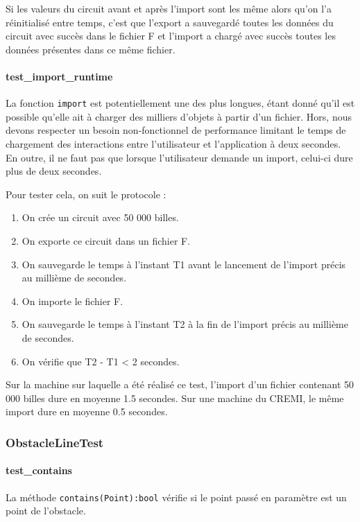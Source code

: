 \documentclass{report}
\begin{document}
Si les valeurs du circuit avant et après l’import sont les même alors qu’on l’a réinitialisé entre temps, c’est que l’export a sauvegardé toutes les données du circuit avec succès dans le fichier F et l’import a chargé avec succès toutes les données présentes dans ce même fichier.

\paragraph{test\_import\_runtime}

La fonction \texttt{import} est potentiellement une des plus longues, étant donné qu’il est possible qu’elle ait à charger des milliers d’objets à partir d’un fichier. Hors, nous devons respecter un besoin non-fonctionnel de performance limitant le temps de chargement des interactions entre l’utilisateur et l’application à deux secondes. En outre, il ne faut pas que lorsque l’utilisateur demande un import, celui-ci dure plus de deux secondes.

Pour tester cela, on suit le protocole : 

\begin{enumerate}
\item On crée un circuit avec 50 000 billes.
\item On exporte ce circuit dans un fichier F.
\item On sauvegarde le temps à l’instant T1 avant le lancement de l’import précis au millième de secondes.
\item On importe le fichier F.
\item On sauvegarde le temps à l’instant T2 à la fin de l’import précis au millième de secondes.
\item On vérifie que T2 - T1 < 2 secondes.
\end{enumerate}

Sur la machine sur laquelle a été réalisé ce test, l’import d’un fichier contenant 50 000 billes dure en moyenne 1.5 secondes. Sur une machine du CREMI, le même import dure en moyenne 0.5 secondes.

\subsubsection{ObstacleLineTest}

\paragraph{test\_contains}

La méthode \texttt{contains(Point):bool} vérifie si le point passé en paramètre est un point de l’obstacle.
\end{document}
